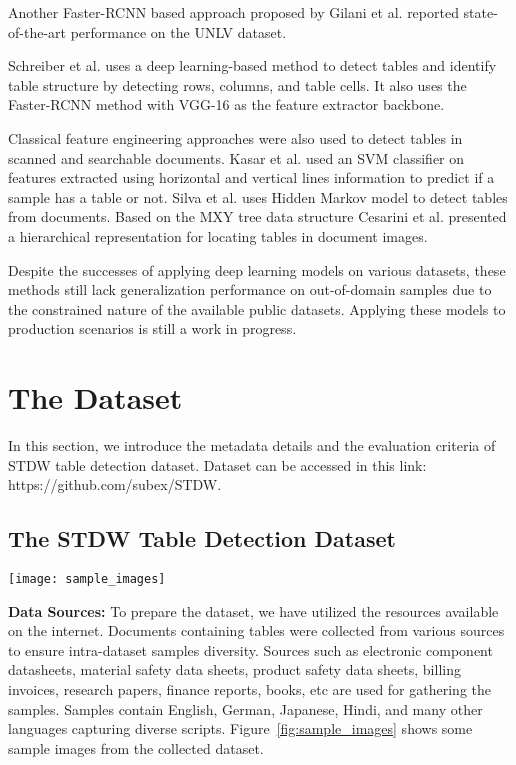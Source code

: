 \documentclass[a4paper,conference]{IEEEtran}
\begin{document}
Another Faster-RCNN based approach proposed by Gilani et al. \cite{gilani} reported state-of-the-art performance on the UNLV dataset.

Schreiber et al. \cite{deepdesrt} uses a deep learning-based method to detect tables and identify table structure by detecting rows, columns, and table cells. It also uses the Faster-RCNN method with VGG-16 as the feature extractor backbone. 

Classical feature engineering approaches were also used to detect tables in scanned and searchable documents. Kasar et al. \cite{kasar} used an SVM classifier on features extracted using horizontal and vertical lines information to predict if a sample has a table or not.  Silva et al. \cite{silva} uses Hidden Markov model to detect tables from documents. Based on the MXY tree data structure Cesarini et al. \cite{cesarini} presented a hierarchical representation for locating tables in document images. 

Despite the successes of applying deep learning models on various datasets, these methods still lack generalization performance on out-of-domain samples due to the constrained nature of the available public datasets. Applying these models to production scenarios is still a work in progress. 




\section{The Dataset}
In this section, we introduce the metadata details and the evaluation criteria of STDW table detection dataset. 
Dataset can be accessed in this link: https://github.com/subex/STDW.

\subsection{The STDW Table Detection Dataset}

\begin{figure*}
  \centering
      \texttt{[image: sample\_images]}
\caption{Dataset samples images with diverse examples}
\label{fig:sample_images}
\end{figure*}

\textbf{Data Sources:} To prepare the dataset, we have utilized the resources available on the internet. Documents containing tables were collected from various sources to ensure intra-dataset samples diversity. Sources such as electronic component datasheets, material safety data sheets, product safety data sheets, billing invoices, research papers, finance reports, books, etc are used for gathering the samples. Samples contain English, German, Japanese, Hindi, and many other languages capturing diverse scripts. Figure~\ref{fig:sample_images} shows some sample images from the collected dataset.
\end{document}
